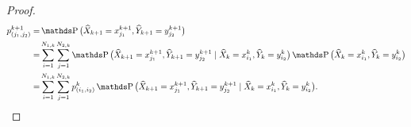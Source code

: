 \begin{proof}
	\begin{equation*}
		\begin{aligned}
			p_{(j_1,j_2)}^{k+1}
			= & \Prob \big( \widehat X_{k+1} = x_{j_1}^{k+1}, \widehat Y_{k+1} = y_{j_2}^{k+1} \big)                                                                                                                                                                        \\
			= & \sum_{i=1}^{N_{1,k}} \sum_{j=1}^{N_{2,k}} \Prob \big( \widehat X_{k+1} = x_{j_1}^{k+1}, \widehat Y_{k+1} = y_{j_2}^{k+1} \mid \widehat X_k = x_{i_1}^k, \widehat Y_k = y_{i_2}^k \big) \Prob \big( \widehat X_k = x_{i_1}^k, \widehat Y_k = y_{i_2}^k \big) \\
			= & \sum_{i=1}^{N_{1,k}} \sum_{j=1}^{N_{2,k}} p_{(i_1,i_2)}^k \Prob \big( \widehat X_{k+1} = x_{j_1}^{k+1}, \widehat Y_{k+1} = y_{j_2}^{k+1} \mid \widehat X_k = x_{i_1}^k, \widehat Y_k = y_{i_2}^k \big).                                                     \\
		\end{aligned}
	\end{equation*}


\end{proof}
